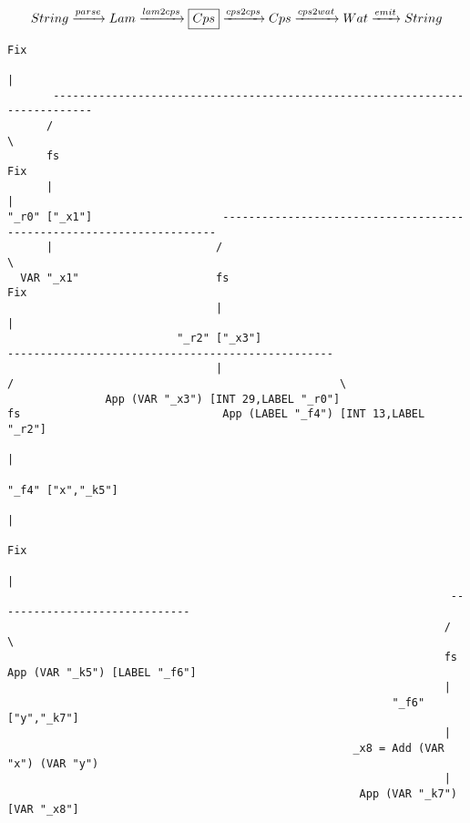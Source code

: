 \begin{landscape}
\begin{gather*}
  String \xrightarrow{parse} Lam \xrightarrow{lam2cps} \boxed{Cps} \xrightarrow{cps2cps} Cps \xrightarrow{cps2wat} Wat \xrightarrow{emit} String
\end{gather*}

\begin{lstlisting}[basicstyle=\fontsize{9}{10}\selectfont\ttfamily]
                                                                           Fix
                                                                            |
       ----------------------------------------------------------------------------
      /                                                                            \
      fs                                                                          Fix
      |                                                                            |
"_r0" ["_x1"]                    ---------------------------------------------------------------------
      |                         /                                                                     \
  VAR "_x1"                     fs                                                                   Fix
                                |                                                                     |
                          "_r2" ["_x3"]                                            --------------------------------------------------
                                |                                                 /                                                  \
               App (VAR "_x3") [INT 29,LABEL "_r0"]                               fs                               App (LABEL "_f4") [INT 13,LABEL "_r2"]
                                                                                  |
                                                                          "_f4" ["x","_k5"]
                                                                                  |
                                                                                 Fix
                                                                                  |
                                                                    ------------------------------
                                                                   /                              \
                                                                   fs               App (VAR "_k5") [LABEL "_f6"]
                                                                   |
                                                           "_f6" ["y","_k7"]
                                                                   |
                                                     _x8 = Add (VAR "x") (VAR "y")
                                                                   |
                                                      App (VAR "_k7") [VAR "_x8"]

\end{lstlisting}
\end{landscape}
\clearpage

